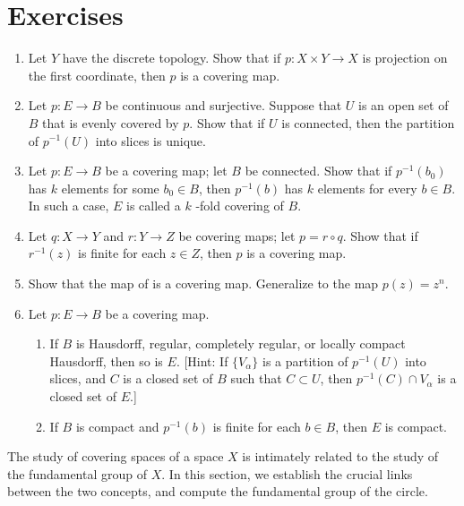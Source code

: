 \section*{Exercises}
\begin{enumerate}[itemsep=0.4em, parsep=0pt, topsep=0pt, partopsep=0pt, leftmargin=*, label=\arabic*., ref=\arabic*]
\item Let \(Y\) have the discrete topology. Show that if \(p : X \times Y \rightarrow X\) is projection on the first coordinate, then \(p\) is a covering map.
\item Let \(p : E \rightarrow B\) be continuous and surjective. Suppose that \(U\) is an open set of \(B\) that is evenly covered by \(p\). Show that if \(U\) is connected, then the partition of \(p^{-1}( U)\) into slices is unique.
\item Let \(p : E \rightarrow B\) be a covering map; let \(B\) be connected. Show that if \(p^{-1}( b_{0})\) has \(k\) elements for some \(b_{0} \in B\), then \(p^{-1}( b)\) has \(k\) elements for every \(b \in B\). In such a case, \(E\) is called a \(k\) -fold covering of \(B\).
\item Let \(q : X \rightarrow Y\) and \(r : Y \rightarrow Z\) be covering maps; let \(p = r \circ q\). Show that if \(r^{-1}( z)\) is finite for each \(z \in Z\), then \(p\) is a covering map.
\item Show that the map of  is a covering map. Generalize to the map \(p( z) = z^{n}.\)
\item Let \(p : E \rightarrow B\) be a covering map.
 \begin{enumerate}[itemsep=0.2em, parsep=0pt, topsep=0pt, partopsep=0pt, leftmargin=*, label=(\alph*), align=left]
 \item If \(B\) is Hausdorff, regular, completely regular, or locally compact Hausdorff, then so is \(E\). [Hint: If \(\{ V_{\alpha }\}\) is a partition of \(p^{-1}( U)\) into slices, and \(C\) is a closed set of \(B\) such that \(C \subset U\), then \(p^{-1}( C) \cap {V}_{\alpha }\) is a closed set of \(E\).]
 \item If \(B\) is compact and \(p^{-1}( b)\) is finite for each \(b \in B\), then \(E\) is compact.
 \end{enumerate}
\end{enumerate}

The study of covering spaces of a space \(X\) is intimately related to the study of the fundamental group of \(X\). In this section, we establish the crucial links between the two concepts, and compute the fundamental group of the circle.

